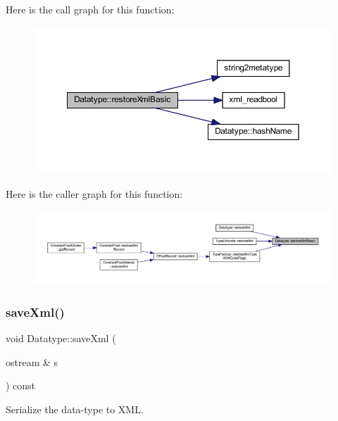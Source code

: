 Here is the call graph for this function\+:
\nopagebreak
\begin{figure}[H]
\begin{center}
\leavevmode
\includegraphics[width=350pt]{class_datatype_afeb70488c52d024b293d5198c98b3f49_cgraph}
\end{center}
\end{figure}
Here is the caller graph for this function\+:
\nopagebreak
\begin{figure}[H]
\begin{center}
\leavevmode
\includegraphics[width=350pt]{class_datatype_afeb70488c52d024b293d5198c98b3f49_icgraph}
\end{center}
\end{figure}
\mbox{\label{class_datatype_a33339824f1c50d4354952296070c3902}} 
\subsubsection{\texorpdfstring{saveXml()}{saveXml()}}
{\footnotesize\ttfamily void Datatype\+::save\+Xml (\begin{DoxyParamCaption}\item[{ostream \&}]{s }\end{DoxyParamCaption}) const\hspace{0.3cm}{\ttfamily [virtual]}}



Serialize the data-\/type to X\+ML. 

